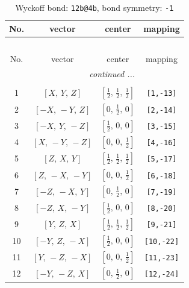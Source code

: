 \documentclass[fleqn,8pt]{jsarticle}
\begin{document}
\begin{longtable}{cccc}
\caption{Wyckoff bond: {\tt 12b@4b}, bond symmetry: {\tt -1}}
 \\
 \hline \hline
No. & vector & center & mapping \\ \hline \endfirsthead

\multicolumn{3}{l}{\tablename\ \thetable{}} \\
 \hline \hline
No. & vector & center & mapping \\ \hline \endhead

 \hline \hline
\multicolumn{3}{r}{\footnotesize\it continued ...} \\ \endfoot

 \hline \hline
\multicolumn{3}{r}{} \\ \endlastfoot

1 & $\left[ X,\, Y,\, Z \right]$ & $\left[ \frac{1}{2},\, \frac{1}{2},\, \frac{1}{2} \right]$ & {\tt [1,-13]} \\ \hline
2 & $\left[ - X,\, - Y,\, Z \right]$ & $\left[ 0,\, \frac{1}{2},\, 0 \right]$ & {\tt [2,-14]} \\ \hline
3 & $\left[ - X,\, Y,\, - Z \right]$ & $\left[ \frac{1}{2},\, 0,\, 0 \right]$ & {\tt [3,-15]} \\ \hline
4 & $\left[ X,\, - Y,\, - Z \right]$ & $\left[ 0,\, 0,\, \frac{1}{2} \right]$ & {\tt [4,-16]} \\ \hline
5 & $\left[ Z,\, X,\, Y \right]$ & $\left[ \frac{1}{2},\, \frac{1}{2},\, \frac{1}{2} \right]$ & {\tt [5,-17]} \\ \hline
6 & $\left[ Z,\, - X,\, - Y \right]$ & $\left[ 0,\, 0,\, \frac{1}{2} \right]$ & {\tt [6,-18]} \\ \hline
7 & $\left[ - Z,\, - X,\, Y \right]$ & $\left[ 0,\, \frac{1}{2},\, 0 \right]$ & {\tt [7,-19]} \\ \hline
8 & $\left[ - Z,\, X,\, - Y \right]$ & $\left[ \frac{1}{2},\, 0,\, 0 \right]$ & {\tt [8,-20]} \\ \hline
9 & $\left[ Y,\, Z,\, X \right]$ & $\left[ \frac{1}{2},\, \frac{1}{2},\, \frac{1}{2} \right]$ & {\tt [9,-21]} \\ \hline
10 & $\left[ - Y,\, Z,\, - X \right]$ & $\left[ \frac{1}{2},\, 0,\, 0 \right]$ & {\tt [10,-22]} \\ \hline
11 & $\left[ Y,\, - Z,\, - X \right]$ & $\left[ 0,\, 0,\, \frac{1}{2} \right]$ & {\tt [11,-23]} \\ \hline
12 & $\left[ - Y,\, - Z,\, X \right]$ & $\left[ 0,\, \frac{1}{2},\, 0 \right]$ & {\tt [12,-24]} \\
\end{longtable}
\end{document}
